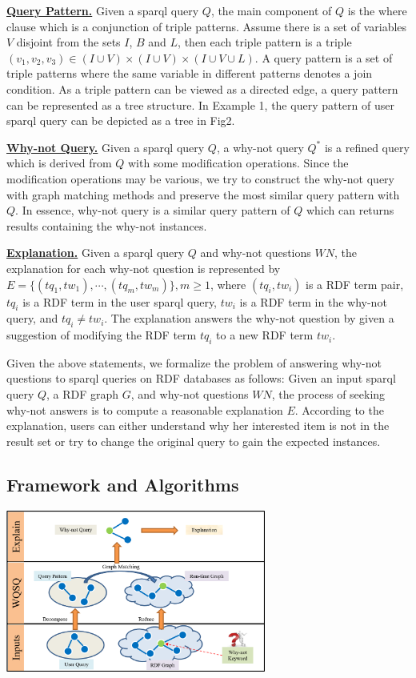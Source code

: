 \documentclass{article}
\begin{document}
\textbf{\underline{Query Pattern.}} Given a sparql query $Q$, the main component of $Q$ is the where clause which is a conjunction of triple patterns. Assume there is a set of variables $V$ disjoint from the sets $I$, $B$ and $L$, then each triple pattern is a triple $(v_1,v_2,v_3 ) \in (I \cup V) \times (I \cup V) \times (I \cup V \cup L)$. A query pattern is a set of triple patterns where the same variable in different patterns denotes a join condition. As a triple pattern can be viewed as a directed edge, a query pattern can be represented as a tree structure. In Example 1, the query pattern of user sparql query can be depicted as a tree in Fig2.

\textbf{\underline{Why-not Query.}} Given a sparql query $Q$, a why-not query $Q^*$ is a refined query which is derived from $Q$ with some modification operations. Since the modification operations may be various, we try to construct the why-not query with graph matching methods and preserve the most similar query pattern with $Q$. In essence, why-not query is a similar query pattern of $Q$ which can returns results containing the why-not instances.

\textbf{\underline{Explanation.}} Given a sparql query $Q$ and why-not questions $WN$,  the explanation for each why-not question is represented by $E=\{(tq_1, tw_1 ), \cdots, (tq_m, tw_m )\}, m \geq 1$, where $(tq_i, tw_i )$ is a RDF term pair, $tq_i$ is a RDF term in the user sparql query, $tw_i$ is a RDF term in the why-not query, and $tq_i \neq tw_i$. The explanation answers the why-not question by given a suggestion of modifying the RDF term $tq_i$ to a new RDF term $tw_i$.

Given the above statements, we formalize the problem of answering why-not questions to sparql queries on RDF databases as follows: Given an input sparql query $Q$, a RDF graph $G$, and why-not questions $WN$, the process of seeking why-not answers is to compute a reasonable explanation $E$. According to the explanation, users can either understand why her interested item is not in the result set or try to change the original query to gain the expected instances.

\subsection{Framework and Algorithms}

\includegraphics[width=3.36in]{framework.png}
\end{document}
